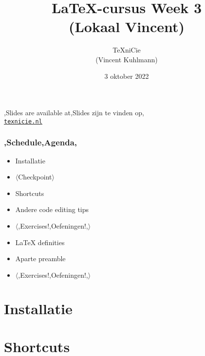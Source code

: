 \documentclass[
    dutch,
    everyoneauthor=true,
    darktheme,
    defaultSlideCollection=vincent,
    handout
]{../../cursuspresentatie}
\title[\LaTeX{}-cursus Week 3]{\LaTeX{}-cursus Week 3\\(Lokaal Vincent)}
\author[\TeX niCie]{\TeX niCie\\{\tiny (Vincent Kuhlmann)}}
\date{3 oktober 2022}
\let\placetarget\relax
\let\placetarget\relax
\begin{document}

\begin{frame}
    \titlepage
    \centering

    {\Large\lang,Slides are available at,Slides zijn te vinden op,\\
    \href{https://texnicie.nl}{\ul{\texttt{texnicie.nl}}}}
\end{frame}

\setul{1pt}{2pt}

\begin{frame}
    \frametitle{\lang,Schedule,Agenda,}
    
    \begin{itemize}
        \item Installatie
        \item $ \langle $Checkpoint$ \rangle $
        \item Shortcuts
        \item Andere code editing tips
        \item $ \langle $\lang,Exercises!,Oefeningen!,$ \rangle $
        \item LaTeX definities
        \item Aparte preamble
        \item $ \langle $\lang,Exercises!,Oefeningen!,$ \rangle $
    \end{itemize}
\end{frame}

\section{Installatie}\label{sec:installatie}

\def\placetarget{\hypertarget{installatie}{}}

\begin{frame}

\end{frame}

\section{Shortcuts}
\end{document}
